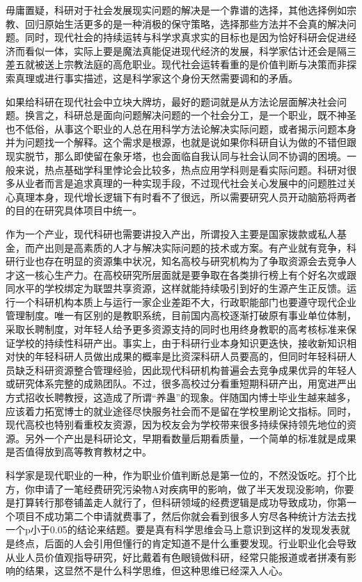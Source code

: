 \documentclass[]{tufte-book}
\begin{document}
毋庸置疑，科研对于社会发展现实问题的解决是一个靠谱的选择，其他选择例如宗教、回归原始生活更多的是一种消极的保守策略，选择那些方法并不会真的解决问题。同时，现代社会的持续运转与科学求真求实的目标也是因为恰好科研会促进经济而看似一体，实际上要是魔法真能促进现代经济的发展，科学家估计还会是隔三差五就被送上宗教法庭的高危职业。现代社会运转看重的是价值判断与决策而非探索真理或进行事实描述，这是科学家这个身份天然需要调和的矛盾。

如果给科研在现代社会中立块大牌坊，最好的题词就是从方法论层面解决社会问题。换言之，科研总是面向问题解决问题的一个社会分工，是一个职业，既不神圣也不低俗，从事这个职业的人总在用科学方法论解决实际问题，或者揭示问题本身并为问题找一个解释。这个需求是根源，也就是说如果你科研自认为做的不错但跟现实脱节，那么即使留在象牙塔，也会面临自我认同与社会认同不协调的困境。一般来说，热点基础学科里悖论会比较多，热点应用学科则是看实际问题。科研对很多从业者而言是追求真理的一种实现手段，不过现代社会关心发展中的问题胜过关心真理本身，现代增长逻辑下有时看不了很远，所以需要研究人员开动脑筋将两者的目的在研究具体项目中统一。

作为一个产业，现代科研也需要讲投入产出，所谓投入主要是国家拨款或私人基金，而产出则是高素质的人才与解决实际问题的技术或方案。有产业就有竞争，科研行业也存在明显的资源集中状况，知名高校与研究机构为了争取资源会去竞争人才这一核心生产力。在高校研究所层面就是要争取在各类排行榜上有个好名次或跟同水平的学校绑定为联盟共享资源，这样就能持续吸引到好的生源产生正反馈。运行一个科研机构本质上与运行一家企业差距不大，行政职能部门也要遵守现代企业管理制度。唯一有区别的是教职系统，目前国内高校逐渐打破原有事业单位体制，采取长聘制度，对年轻人给予更多资源支持的同时也用终身教职的高考核标准来保证学校的持续性科研产出。事实上，由于科研行业本身知识更迭快，接收新知识相对快的年轻科研人员做出成果的概率是比资深科研人员要高的，但同时年轻科研人员缺乏科研资源整合管理经验，因此现代科研机构普遍会去竞争成果优异的年轻人或研究体系完整的成熟团队。不过，很多高校过分看重短期科研产出，用宽进严出方式招收长聘教授，这造成了所谓``养蛊''的现象。伴随国内博士毕业生越来越多，应该着力拓宽博士的就业途径尽快服务社会而不是留在学校里刷论文指标。同时，现代高校也特别看重校友资源，因为校友会为学校带来很多持续保持领先地位的资源。另外一个产出是科研论文，早期看数量后期看质量，一个简单的标准就是成果是否值得放到高等教育教材之中。

科学家是现代职业的一种，作为职业价值判断总是第一位的，不然没饭吃。打个比方，你申请了一笔经费研究污染物A对疾病甲的影响，做了半天发现没影响，你要是打算转行那卷铺盖走人就行了，但科研领域的经费逻辑是成功导致成功，你第一个项目不成功第二个申请就费事了，然后你就会看到很多人穷尽各种统计方法去找一个p小于0.05的结论来结题。要是真有科学思维会马上意识到这样的发现发表就是终点，后面的人会引用但懂行的肯定知道不是什么重要发现。行业职业化会导致从业人员价值观指导研究，好比戴着有色眼镜做科研，经常只能报道或者拼凑有影响的结果，这显然不是什么科学思维，但这种思维已经深入人心。
\end{document}
